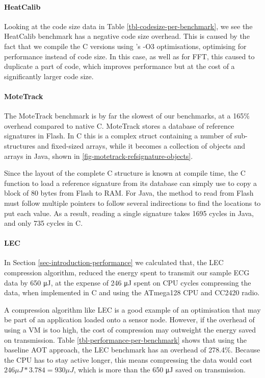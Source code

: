 \paragraph{HeatCalib}
Looking at the code size data in Table \ref{tbl-codesize-per-benchmark}, we see the HeatCalib benchmark has a negative code size overhead. This is caused by the fact that we compile the C versions using 's -O3 optimisations, optimising for performance instead of code size. In this case, as well as for FFT, this caused  to duplicate a part of code, which improves performance but at the cost of a significantly larger code size.

\paragraph{MoteTrack}
The MoteTrack benchmark is by far the slowest of our benchmarks, at a 165\% overhead compared to native C. MoteTrack stores a database of reference signatures in Flash. In C this is a complex struct containing a number of sub-structures and fixed-sized arrays, while it becomes a collection of objects and arrays in Java, shown in \ref{fig-motetrack-refsignature-objects}.

Since the layout of the complete C structure is known at compile time, the C function to load a reference signature from its database can simply use  to copy a block of 80 bytes from Flash to RAM. For Java, the method to read from Flash must follow multiple pointers to follow several indirections to find the locations to put each value. As a result, reading a single signature takes 1695 cycles in Java, and only 735 cycles in C.

\paragraph{LEC}
In Section \ref{sec-introduction-performance} we calculated that, the LEC compression algorithm, reduced the energy spent to transmit our sample ECG data by 650 μJ, at the expense of 246 μJ spent on CPU cycles compressing the data, when implemented in C and using the ATmega128 CPU and CC2420 radio.

A compression algorithm like LEC is a good example of an optimisation that may be part of an application loaded onto a sensor node. However, if the overhead of using a VM is too high, the cost of compression may outweight the energy saved on transmission. Table \ref{tbl-performance-per-benchmark} shows that using the baseline AOT approach, the LEC benchmark has an overhead of 278.4\%. Because the CPU has to stay active longer, this means compressing the data would cost $246 \mu J * 3.784 = 930 \mu J$, which is more than the 650 μJ saved on transmission.


